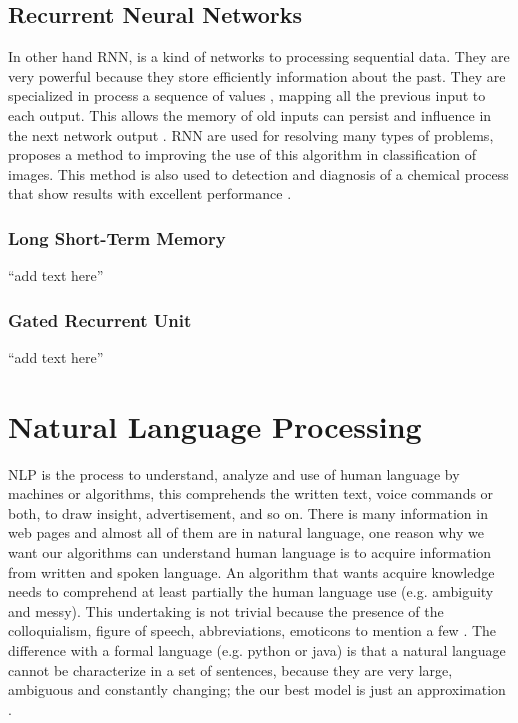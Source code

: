 \documentclass[12pt]{report}
\begin{document}
\subsection{Recurrent Neural Networks}
In other hand \ac{RNN}, is a kind of networks to processing sequential data. They are very powerful because they store efficiently information about the past. They are specialized in process a sequence of values \cite{Goodfellow2016}, mapping all the previous input to each output. This allows the memory of old inputs can persist and influence in the next network output \cite{Graves2017}. \ac{RNN} are used for resolving many types of problems, \cite{Chandra2017} proposes a method to improving the use of this algorithm in classification of images. This method is also used to detection and diagnosis of a chemical process that show results with excellent performance \cite{Xavier2018}.

\subsubsection{Long Short-Term Memory}
``add text here''
\subsubsection{Gated Recurrent Unit}
``add text here''

\section{Natural Language Processing}

\ac{NLP} is the process to understand, analyze and use of human language by machines or algorithms, this comprehends the written text, voice commands or both, to draw insight, advertisement, and so on. There is many information in web pages and almost all of them are in natural language, one reason why we want our algorithms can understand human language is to acquire information from written and spoken language. An algorithm that wants acquire knowledge needs to comprehend at least partially the human language use (e.g. ambiguity and messy). This undertaking is not trivial because the presence of the colloquialism, figure of speech, abbreviations, emoticons to mention a few \cite{Nevala2017} \cite{Russell2010}. The difference with a formal language (e.g. python or java) is that a natural language cannot be characterize in a set of sentences, because they are very large, ambiguous and constantly changing; the our best model is just an approximation \cite{Russell2010}.
\end{document}
